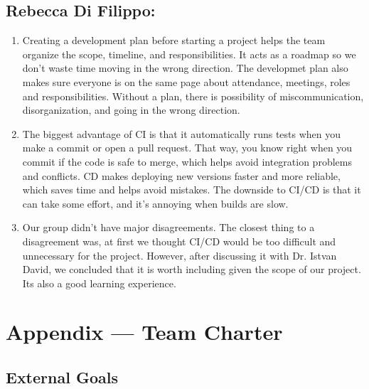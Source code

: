 \documentclass{article}
\begin{document}
\subsection*{Rebecca Di Filippo:}\label{subsec:rebecca-difilippo-reflection}
\begin{enumerate}
  \item Creating a development plan before starting a project helps the team organize the scope,
   timeline, and responsibilities. It acts as a roadmap so we don’t waste time
    moving in the wrong direction. The developmet plan also makes sure everyone is on the same page 
    about attendance, meetings, roles and responsibilities. Without a plan, there is possibility of miscommunication,
    disorganization, and going in the wrong direction.
  \item The biggest advantage of CI is that it automatically runs tests when you make a commit
   or open a pull request. That way, you know right when you commit if the code is safe to merge, which helps 
   avoid integration problems and conflicts. CD makes deploying new versions faster and more reliable,
    which saves time and helps avoid mistakes. The downside to CI/CD is that it can take some effort,
    and it’s annoying when builds are slow.
  \item Our group didn’t have major disagreements. The closest thing to a disagreement was, at first we
  thought CI/CD would be too difficult and unnecessary for the project. However, after discussing it
  with Dr. Istvan David, we concluded that it is worth including given the scope of our project. Its also
  a good learning experience.
\end{enumerate}

\newpage{}

\section*{Appendix --- Team Charter}


\subsection*{External Goals}

\end{document}
